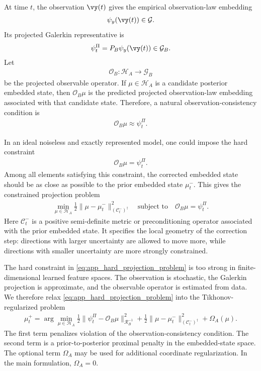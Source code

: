 \documentclass[twoside,11pt]{article}
\begin{document}
At time $t$, the observation $\vy(t)$ gives the empirical observation-law
embedding
\begin{align}
\psi_y(\vy(t))
\in \mathcal G.
\end{align}
Its projected Galerkin representative is
\begin{align}
\psi_t^\Pi
=
P_B\psi_y(\vy(t))
\in \mathcal G_B.
\end{align}
Let
\begin{align}
\mathcal O_B:\mathcal H_A\to\mathcal G_B
\end{align}
be the projected observable operator. If $\mu\in\mathcal H_A$ is a
candidate posterior embedded state, then $\mathcal O_B\mu$ is the
predicted projected observation-law embedding associated with that
candidate state. Therefore, a natural observation-consistency condition
is
\begin{align}
\mathcal O_B\mu
\approx
\psi_t^\Pi.
\label{eq:app_observation_consistency}
\end{align}

In an ideal noiseless and exactly represented model, one could impose
the hard constraint
\begin{align}
\mathcal O_B\mu
=
\psi_t^\Pi.
\label{eq:app_hard_observation_constraint}
\end{align}
Among all elements satisfying this constraint, the corrected embedded
state should be as close as possible to the prior embedded state
$\mu_t^-$. This gives the constrained projection problem
\begin{align}
\min_{\mu\in\mathcal H_A}
\frac12
\|\mu-\mu_t^-\|_{(\mathcal C_t^-)^\dagger}^2
\quad
\text{subject to}
\quad
\mathcal O_B\mu=\psi_t^\Pi.
\label{eq:app_hard_projection_problem}
\end{align}
Here $\mathcal C_t^-$ is a positive semi-definite metric or
preconditioning operator associated with the prior embedded state. It
specifies the local geometry of the correction step: directions with
larger uncertainty are allowed to move more, while directions with
smaller uncertainty are more strongly constrained.

The hard constraint in \eqref{eq:app_hard_projection_problem} is too
strong in finite-dimensional learned feature spaces. The observation is
stochastic, the Galerkin projection is approximate, and the observable
operator is estimated from data. We therefore relax
\eqref{eq:app_hard_projection_problem} into the Tikhonov-regularized
problem
\begin{align}
\mu_t^+
=
\arg\min_{\mu\in\mathcal H_A}
\frac12
\|\psi_t^\Pi-\mathcal O_B\mu\|_{\mathcal R_B^{-1}}^2
+
\frac12
\|\mu-\mu_t^-\|_{(\mathcal C_t^-)^\dagger}^2
+
\Omega_A(\mu).
\label{eq:app_tikhonov_correction_objective}
\end{align}
The first term penalizes violation of the observation-consistency
condition. The second term is a prior-to-posterior proximal penalty in
the embedded-state space. The optional term $\Omega_A$ may be used for
additional coordinate regularization. In the main formulation,
$\Omega_A=0$.
\end{document}

